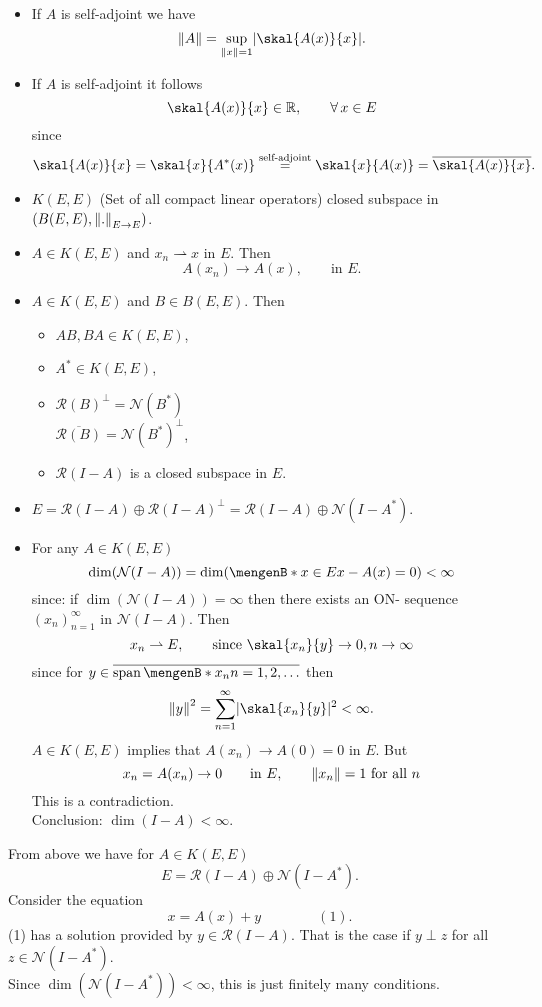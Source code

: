 \begin{itemize}
	\item If $A$ is self-adjoint we have
	\[
		\norm{A} = \sup_{\norm{x}=1} \abs{\skal{A(x)}{x}}.
	\]
	\item If $A$ is self-adjoint it follows
	\[
		\skal{A(x)}{x} \in \mathbb{R}, \qquad \forall\, x \in E
	\]
	since
	\begin{align*}
		\skal{A(x)}{x} = \skal{x}{A^*(x)} \stackrel{\text{self-adjoint}}{=} \skal{x}{A(x)} = \overline{\skal{A(x)}{x}}.
	\end{align*} 
	\item $K(E,E)$ (Set of all compact linear operators) closed subspace in $(B(E,E),\norm{.}_{E \to E})$.
	\item $A \in K(E,E)$ and $x_n \rightharpoonup x$ in $E$. Then
	\[
		A(x_n) \to A(x), \qquad \text{in }E.
	\]
	\item $A \in K(E,E)$ and $B \in B(E,E)$. Then
	\begin{itemize}
		\item $AB, BA \in K(E,E)$,
		\item $A^* \in K(E,E)$,
		\item $\mathcal{R}(B)^{\perp} = \mathcal{N}(B^*)$ \\
		$\overline{\mathcal{R}(B)} = \mathcal{N}(B^*)^{\perp}$,
		\item $\mathcal{R}(I-A)$ is a closed subspace in $E$.
	\end{itemize}
	\item $E = \mathcal{R}(I-A) \oplus \mathcal{R}(I-A)^{\perp} = \mathcal{R}(I-A) \oplus \mathcal{N}(I-A^*)$.
	\item For any $A \in K(E,E)$
	\[
		\dim(\mathcal{N}(I-A)) = \dim(\set[x \in E]{x-A(x)=0}) < \infty
	\]
	since: if $\dim(\mathcal{N}(I-A))= \infty$ then there exists an ON- sequence $(x_n)_{n=1}^{\infty}$ in $\mathcal{N}(I-A)$. Then
	\[
		x_n \rightharpoonup E, \qquad \text{since } \skal{x_n}{y} \to 0, n \to \infty
	\]
	since for $y \in \overline{\spn\set[x_n]{n=1,2,\dots}}$ then
	\[
		\norm{y}^2 = \sum_{n=1}^{\infty} \abs{\skal{x_n}{y}}^2 < \infty.
	\]
	$A \in K(E,E)$ implies that $A(x_n) \to A(0)=0$ in $E$. But
	\[
		x_n = A(x_n) \to 0 \qquad \text{in }E, \qquad \norm{x_n}=1 \text{ for all }n
	\]
	This is a contradiction. \\
	Conclusion: $\dim(I-A) < \infty$.
\end{itemize}
From above we have for $A \in K(E,E)$ \[
	E = \mathcal{R}(I-A) \oplus \mathcal{N}(I-A^*).
\]
Consider the equation
\[
	x = A(x)+ y \qquad \qquad (1).
\]
(1) has a solution provided by $y \in \mathcal{R}(I-A)$. That is the case if $y \perp z$ for all $z \in \mathcal{N}(I-A^*)$. \\
Since $\dim(\mathcal{N}(I-A^*)) < \infty$, this is just finitely many conditions.


